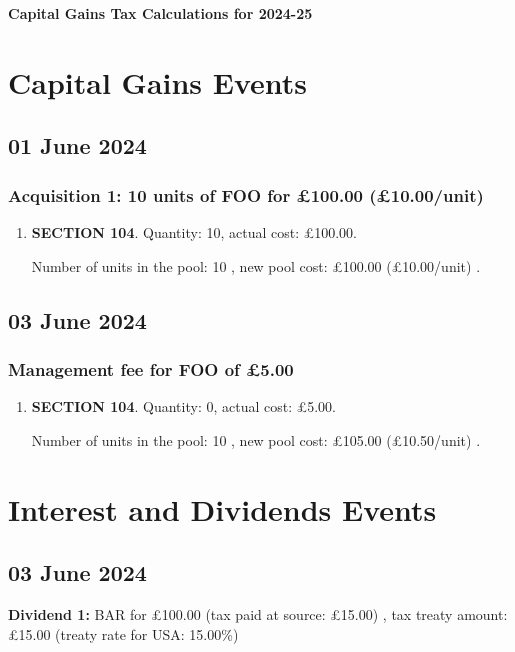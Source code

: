 \documentclass{article}
\begin{document}
\centerline{\Large\bfseries Capital Gains Tax Calculations for 2024-25}

\section*{Capital Gains Events}


\subsection*{01 June 2024}
\subsubsection*{
    Acquisition 1: 10 units of FOO for £100.00
    (£10.00/unit)%
}

\begin{enumerate}
\item \textbf{SECTION 104}. Quantity: 10,
    actual cost: £100.00.

    Number of units in the pool:
    10%
,
    new pool cost: £100.00
    (£10.00/unit)%
.

\end{enumerate}



\subsection*{03 June 2024}
\subsubsection*{Management fee for FOO of £5.00}

\begin{enumerate}
\item \textbf{SECTION 104}. Quantity: 0,
    actual cost: £5.00.

    Number of units in the pool:
    10%
,
    new pool cost: £105.00
    (£10.50/unit)%
.

\end{enumerate}



\clearpage
\section*{Interest and Dividends Events}


\subsection*{03 June 2024}
\textbf{Dividend 1:} BAR for £100.00
(tax paid at source: £15.00)
, tax treaty amount: £15.00 (treaty rate for USA: 15.00\%)
\end{document}
